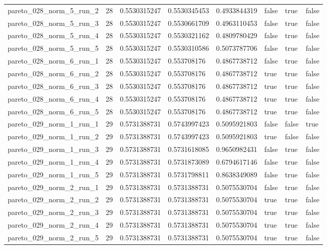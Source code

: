 \begin{tabular}{@{}llllllll@{}}
pareto\_028\_norm\_5\_run\_2 & 28 & 0.5530315247 & 0.5530345453 & 0.4933844319 & false & true & false \\
pareto\_028\_norm\_5\_run\_3 & 28 & 0.5530315247 & 0.5530661709 & 0.4963110453 & false & true & false \\
pareto\_028\_norm\_5\_run\_4 & 28 & 0.5530315247 & 0.5530321162 & 0.4809780429 & false & true & false \\
pareto\_028\_norm\_5\_run\_5 & 28 & 0.5530315247 & 0.5530310586 & 0.5073787706 & false & true & false \\
pareto\_028\_norm\_6\_run\_1 & 28 & 0.5530315247 & 0.553708176 & 0.4867738712 & false & true & false \\
pareto\_028\_norm\_6\_run\_2 & 28 & 0.5530315247 & 0.553708176 & 0.4867738712 & true & true & false \\
pareto\_028\_norm\_6\_run\_3 & 28 & 0.5530315247 & 0.553708176 & 0.4867738712 & true & true & false \\
pareto\_028\_norm\_6\_run\_4 & 28 & 0.5530315247 & 0.553708176 & 0.4867738712 & true & true & false \\
pareto\_028\_norm\_6\_run\_5 & 28 & 0.5530315247 & 0.553708176 & 0.4867738712 & true & true & false \\
pareto\_029\_norm\_1\_run\_1 & 29 & 0.5731388731 & 0.5743997423 & 0.5095921803 & false & false & true \\
pareto\_029\_norm\_1\_run\_2 & 29 & 0.5731388731 & 0.5743997423 & 0.5095921803 & true & false & false \\
pareto\_029\_norm\_1\_run\_3 & 29 & 0.5731388731 & 0.5731618085 & 0.9650982431 & false & true & false \\
pareto\_029\_norm\_1\_run\_4 & 29 & 0.5731388731 & 0.5731873089 & 0.6794617146 & false & true & false \\
pareto\_029\_norm\_1\_run\_5 & 29 & 0.5731388731 & 0.5731798811 & 0.8638349089 & false & true & false \\
pareto\_029\_norm\_2\_run\_1 & 29 & 0.5731388731 & 0.5731388731 & 0.5075530704 & false & true & false \\
pareto\_029\_norm\_2\_run\_2 & 29 & 0.5731388731 & 0.5731388731 & 0.5075530704 & true & true & false \\
pareto\_029\_norm\_2\_run\_3 & 29 & 0.5731388731 & 0.5731388731 & 0.5075530704 & true & true & false \\
pareto\_029\_norm\_2\_run\_4 & 29 & 0.5731388731 & 0.5731388731 & 0.5075530704 & true & true & false \\
pareto\_029\_norm\_2\_run\_5 & 29 & 0.5731388731 & 0.5731388731 & 0.5075530704 & true & true & false \\

\end{tabular}
